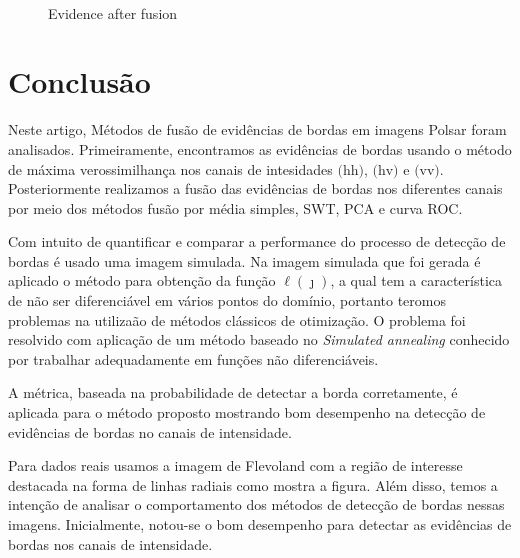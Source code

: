 \documentclass[conference]{IEEEtran}
\begin{document}
\begin{figure}[hbt]
{     }
     \\
     \caption{Evidence after fusion}
     \label{fig12}
   \end{figure}	

\section{Conclusão}\label{sec_08}

Neste artigo, Métodos de fusão de evidências de bordas em imagens Polsar foram analisados. Primeiramente, encontramos as evidências de bordas usando o método de máxima verossimilhança nos canais de intesidades $\text{(hh)}$, $\text{(hv)}$ e $\text{(vv)}$. Posteriormente realizamos a fusão das evidências de bordas nos diferentes canais por meio dos métodos fusão por média simples, SWT, PCA e curva ROC.

Com intuito de quantificar e comparar a performance do processo de detecção de bordas é usado uma imagem simulada. Na imagem simulada que foi gerada é aplicado o método para obtenção  da função $\ell(\jmath)$, a qual tem a característica de não ser diferenciável em vários pontos do domínio, portanto teromos problemas na utilizaão de métodos clássicos de otimização. O problema foi resolvido com aplicação de um método baseado no {\it Simulated annealing} conhecido por trabalhar adequadamente em funções não diferenciáveis.

 A métrica, baseada na probabilidade de detectar a borda corretamente, é aplicada para o método proposto mostrando bom desempenho na detecção de evidências de bordas no canais de intensidade.
  
  Para dados reais usamos a imagem de Flevoland com a região de interesse destacada na forma de linhas radiais como mostra a figura. Além disso, temos a intenção de analisar o comportamento dos métodos de detecção de bordas nessas imagens. Inicialmente, notou-se o bom desempenho para detectar as evidências de bordas nos canais de intensidade.   
   
  


\end{document}
